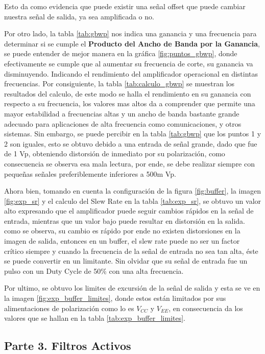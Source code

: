         Esto da como evidencia que puede existir una señal offset que puede cambiar nuestra señal de salida, ya sea amplificada o no.

        Por otro lado, la tabla \ref{tab:gbwp} nos indica una ganancia y una frecuencia para determinar si se cumple el \textbf{Producto del Ancho de Banda por la Ganancia}, se puede entender de mejor manera en la gráfica \ref{fig:puntos_gbwp}, donde efectivamente se cumple que al aumentar su frecuencia de corte, su ganancia va disminuyendo. Indicando el rendimiento del amplificador operacional en distintas frecuencias. Por consiguiente, la tabla \ref{tab:calculo_gbwp} se muestran los resultados del calculo, de este modo se halla el rendimiento en su ganancia con respecto a su frecuencia, los valores mas altos da a comprender que permite una mayor estabilidad a frecuencias altas y un ancho de banda bastante grande adecuado para aplicaciones de alta frecuencia como comunicaciones, y otros sistemas. Sin embargo, se puede percibir en la tabla \ref{tab:gbwp} que los puntos 1 y 2 son iguales, esto se obtuvo debido a una entrada de señal grande, dado que fue de 1 Vp, obteniendo distorsión de inmediato por su polarización, como consecuencia se observa esa mala lectura, por ende, se debe realizar siempre con pequeñas señales preferiblemente inferiores a 500m Vp.

        Ahora bien, tomando en cuenta la configuración de la figura \ref{fig:buffer}, la imagen \ref{fig:exp_sr} y el calculo del Slew Rate en la tabla \ref{tab:exp_sr}, se obtuvo un valor alto expresando que el amplificador puede seguir cambios rápidos en la señal de entrada, mientras que un valor bajo puede resultar en distorsión en la salida. como se observa, su cambio es rápido por ende no existen distorsiones en la imagen de salida, entonces en un buffer, el slew rate puede no ser un factor crítico siempre y cuando la frecuencia de la señal de entrada no sea tan alta, éste se puede convertir en un limitante. Sin olvidar que su señal de entrada fue un pulso con un  Duty Cycle de 50\% con una alta frecuencia.

        Por ultimo, se obtuvo los limites de excursión de la señal de salida y esta se ve en la imagen \ref{fig:exp_buffer_limites}, donde estos están limitados por sus alimentaciones de polarización como lo es $V_{CC}$ y $V_{EE}$, en consecuencia da los valores que se hallan en la tabla \ref{tab:exp_buffer_limites}. 

    \subsection{Parte 3. Filtros Activos}

